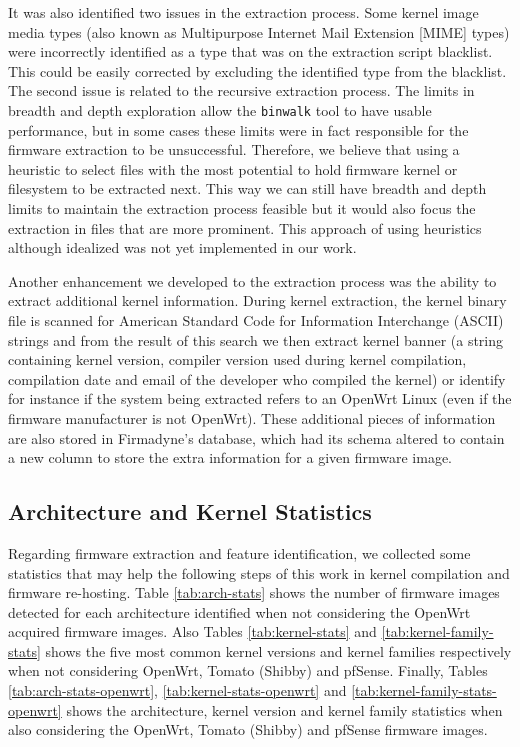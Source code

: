It was also identified two issues in the extraction process. Some kernel image media types (also known as Multipurpose Internet Mail Extension [MIME] types) were incorrectly identified as a type that was on the extraction script blacklist. This could be easily corrected by excluding the identified type from the blacklist. The second issue is related to the recursive extraction process. The limits in breadth and depth exploration allow the {\tt binwalk} tool to have usable performance, but in some cases these limits were in fact responsible for the firmware extraction to be unsuccessful. Therefore, we believe that using a heuristic to select files with the most potential to hold firmware kernel or filesystem to be extracted next. This way we can still have breadth and depth limits to maintain the extraction process feasible but it would also focus the extraction in files that are more prominent. This approach of using heuristics although idealized was not yet implemented in our work.

Another enhancement we developed to the extraction process was the ability to extract additional kernel information. During kernel extraction, the kernel binary file is scanned for American Standard Code for Information Interchange (ASCII) strings and from the result of this search we then extract kernel banner (a string containing kernel version, compiler version used during kernel compilation, compilation date and email of the developer who compiled the kernel) or identify for instance if the system being extracted refers to an OpenWrt Linux (even if the firmware manufacturer is not OpenWrt). These additional pieces of information are also stored in Firmadyne's \cite{firmadyne} database, which had its schema altered to contain a new column to store the extra information for a given firmware image.


\subsection{Architecture and Kernel Statistics}

Regarding firmware extraction and feature identification, we collected some statistics that may help the following steps of this work in kernel compilation and firmware re-hosting. Table \ref{tab:arch-stats} shows the number of firmware images detected for each architecture identified when not considering the OpenWrt acquired firmware images. Also Tables \ref{tab:kernel-stats} and \ref{tab:kernel-family-stats} shows the five most common kernel versions and kernel families respectively when not considering OpenWrt, Tomato (Shibby) and pfSense. Finally, Tables \ref{tab:arch-stats-openwrt}, \ref{tab:kernel-stats-openwrt} and \ref{tab:kernel-family-stats-openwrt} shows the architecture, kernel version and kernel family statistics when also considering the OpenWrt, Tomato (Shibby) and pfSense firmware images.

